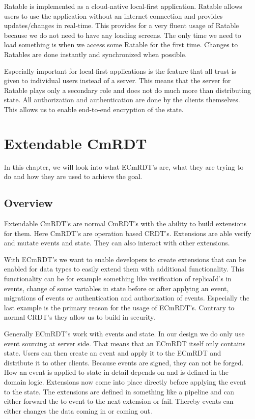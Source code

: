 \documentclass[
	ngerman,
	ruledheaders=section,   %
	class=report,		    %
	thesis={type=bachelor}, %
	accentcolor=9c,			%
	custommargins=false,    %
	marginpar=false,        %
	parskip=half-,          %
	fontsize=11pt,          %
]{tudapub}
\begin{document}
Ratable is implemented as a cloud-native local-first application. Ratable allows users to use the application without an internet connection and provides updates/changes in real-time. This provides for a very fluent usage of Ratable because we do not need to have any loading screens. The only time we need to load something is when we access some Ratable for the first time. Changes to Ratables are done instantly and synchronized when possible.

Especially important for local-first applications is the feature that all trust is given to individual users instead of a server. This means that the server for Ratable plays only a secondary role and does not do much more than distributing state. All authorization and authentication are done by the clients themselves. This allows us to enable end-to-end encryption of the state.

\chapter{Extendable CmRDT}
In this chapter, we will look into what ECmRDT's are, what they are trying to do and how they are used to achieve the goal.

\section{Overview}
Extendable CmRDT's are normal CmRDT's with the ability to build extensions for them. Here CmRDT's are operation based CRDT's. Extensions are able verify and mutate events and state. They can also interact with other extensions. 

With ECmRDT's we want to enable developers to create extensions that can be enabled for data types to easily extend them with additional functionality. This functionality can be for example something like verification of replicaId's in events, change of some variables in state before or after applying an event, migrations of events or authentication and authorization of events. Especially the last example is the primary reason for the usage of ECmRDT's. Contrary to normal CRDT's they allow us to build in security.

Generally ECmRDT's work with events and state. In our design we do only use event sourcing at server side. That means that an ECmRDT itself only contains state. Users can then create an event and apply it to the ECmRDT and distribute it to other clients. Because events are signed, they can not be forged. How an event is applied to state in detail depends on and is defined in the domain logic. Extensions now come into place directly before applying the event to the state. The extensions are defined in something like a pipeline and can either forward the to event to the next extension or fail. Thereby events can either changes the data coming in or coming out.
\end{document}
